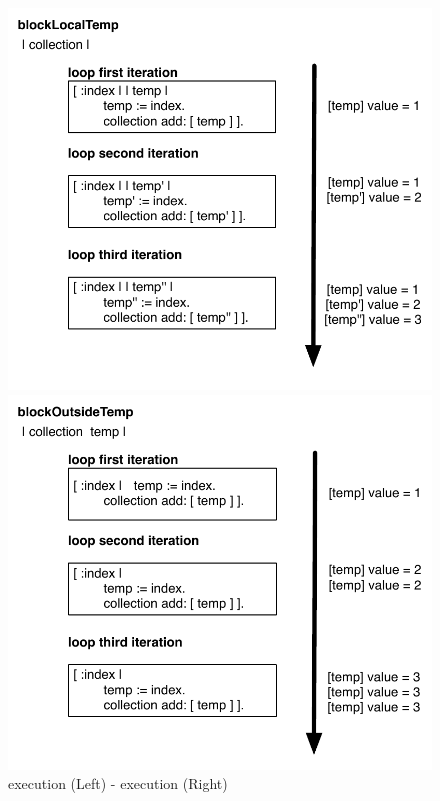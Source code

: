 \documentclass[a4paper,10pt,twoside]{book}
\begin{document}
\begin{figure}
	\centering
		\begin{minipage}[c]{5.5cm}
        \includegraphics[width=\linewidth]{blockClosureLocalTemp}
        \end{minipage}
        \begin{minipage}[c]{5.5cm}
        \includegraphics[width=\linewidth]{blockClosureOutsideTemp}
        \end{minipage}
	\caption{ execution (Left) -  execution (Right)}
	\label{fig:blockLocalTempExecution}
\end{figure}
\end{document}

